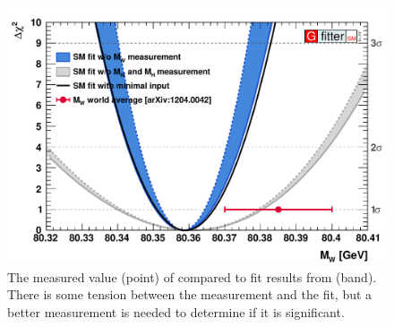 \begin{figure}[!htbs]
    \centering
    \includegraphics[width=\textwidth]{figures/gfitter_wm.pdf}
    \caption[
        The measured value of \MassW compared to fit results from \GFitter.
    ]{
        The measured value (point) of \MassW compared to fit results from
        \GFitter (band). There is some tension between the measurement and the
        fit, but a better measurement is needed to determine if it is
        significant.
    }
    \label{fig:gfitter_mw}
\end{figure}
